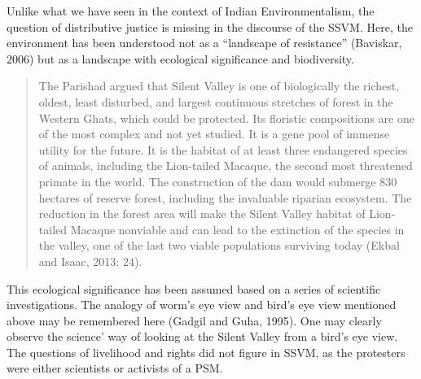 \documentclass[twoside, 13pt]{article}
\begin{document}
{{{{\fontsize{12}{14}\selectfont Unlike what we have seen in the context of Indian Environmentalism, the question of distributive justice is missing in the discourse of the SSVM. Here, the environment has been understood not as a “landscape of resistance” (Baviskar, 2006) but as a landscape with ecological significance and biodiversity.

\begin{quote}
The Parishad argued that Silent Valley is one of biologically the richest, oldest, least disturbed, and largest continuous stretches of forest in the Western Ghats, which could be protected. Its floristic compositions are one of the most complex and not yet studied. It is a gene pool of immense utility for the future. It is the habitat of at least three endangered species of animals, including the Lion-tailed Macaque, the second most threatened primate in the world. The construction of the dam would submerge 830 hectares of reserve forest, including the invaluable riparian ecosystem. The reduction in the forest area will make the Silent Valley habitat of Lion-tailed Macaque nonviable and can lead to the extinction of the species in the valley, one of the last two viable populations surviving today (Ekbal and Isaac, 2013: 24).
\end{quote}

This ecological significance has been assumed based on a series of scientific investigations. The analogy of worm’s eye view and bird’s eye view mentioned above may be remembered here (Gadgil and Guha, 1995). One may clearly observe the science’ way of looking at the Silent Valley from a bird’s eye view. The questions of livelihood and rights did not figure in SSVM, as the protesters were either scientists or activists of a PSM.

}}}}
\end{document}
